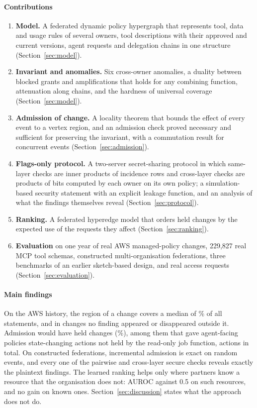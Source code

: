 \paragraph{Contributions}
\begin{enumerate}
\item \textbf{Model.} A federated dynamic policy hypergraph that represents tool, data and usage rules of several owners, tool descriptions with their approved and current versions, agent requests and delegation chains in one structure (Section~\ref{sec:model}).
\item \textbf{Invariant and anomalies.} Six cross-owner anomalies, a duality between blocked grants and amplifications that holds for any combining function, attenuation along chains, and the hardness of universal coverage (Section~\ref{sec:model}).
\item \textbf{Admission of change.} A locality theorem that bounds the effect of every event to a vertex region, and an admission check proved necessary and sufficient for preserving the invariant, with a commutation result for concurrent events (Section~\ref{sec:admission}).
\item \textbf{Flags-only protocol.} A two-server secret-sharing protocol in which same-layer checks are inner products of incidence rows and cross-layer checks are products of bits computed by each owner on its own policy; a simulation-based security statement with an explicit leakage function, and an analysis of what the findings themselves reveal (Section~\ref{sec:protocol}).
\item \textbf{Ranking.} A federated hyperedge model that orders held changes by the expected use of the requests they affect (Section~\ref{sec:ranking}).
\item \textbf{Evaluation} on one year of real AWS managed-policy changes, 229,827 real MCP tool schemas, constructed multi-organisation federations, three benchmarks of an earlier sketch-based design, and real access requests (Section~\ref{sec:evaluation}).
\end{enumerate}

\paragraph{Main findings} On the AWS history, the region of a change covers a median of \awsRegMed\% of all statements, and in \awsEvents{} changes no finding appeared or disappeared outside it. Admission would have held \awsHeld{} changes (\awsHeldPct\%), among them \awsAmpROEv{} that gave agent-facing policies state-changing actions not held by the read-only job function, \awsAmpROAct{} actions in total. On constructed federations, incremental admission is exact on \eOneEvents{} random events, and every one of the \eOneSP{} pairwise and \eOneSC{} cross-layer secure checks reveals exactly the plaintext findings. The learned ranking helps only where partners know a resource that the organisation does not: AUROC \rkFedNew{} against 0.5 on such resources, and no gain on known ones. Section~\ref{sec:discussion} states what the approach does not do.

